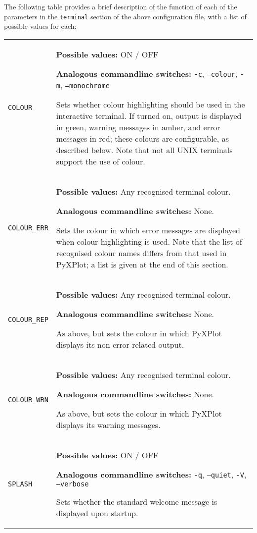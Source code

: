 \documentclass[a4paper,onecolumn,11pt]{book}
\begin{document}
The following table provides a brief description of the function of each of the
parameters in the \texttt{terminal} section of the above configuration file,
with a list of possible values for each:

\begin{longtable}{p{3.4cm}p{9cm}}
\texttt{COLOUR} & \textbf{Possible values:} ON / OFF

                  \textbf{Analogous commandline switches:} \texttt{-c}, \texttt{--colour}, \texttt{-m}, \texttt{--monochrome}

                  Sets whether colour highlighting should be used in the interactive terminal. If turned on, output is displayed in green, warning messages in amber, and error messages in red; these colours are configurable, as described below. Note that not all UNIX terminals support the use of colour.
                   \\
\texttt{COLOUR\_ERR} & \textbf{Possible values:} Any recognised terminal colour.

                  \textbf{Analogous commandline switches:} None.

                  Sets the colour in which error messages are displayed when colour highlighting is used. Note that the list of recognised colour names differs from that used in PyXPlot; a list is given at the end of this section.
                   \\
\texttt{COLOUR\_REP} & \textbf{Possible values:} Any recognised terminal colour.

                  \textbf{Analogous commandline switches:} None.

                  As above, but sets the colour in which PyXPlot displays its non-error-related output.
                   \\
\texttt{COLOUR\_WRN} & \textbf{Possible values:} Any recognised terminal colour.

                  \textbf{Analogous commandline switches:} None.

                  As above, but sets the colour in which PyXPlot displays its warning messages.
                   \\
\texttt{SPLASH} & \textbf{Possible values:} ON / OFF

                  \textbf{Analogous commandline switches:} \texttt{-q}, \texttt{--quiet}, \texttt{-V}, \texttt{--verbose}

                  Sets whether the standard welcome message is displayed upon startup.
                   \\
\end{longtable}
\end{document}
